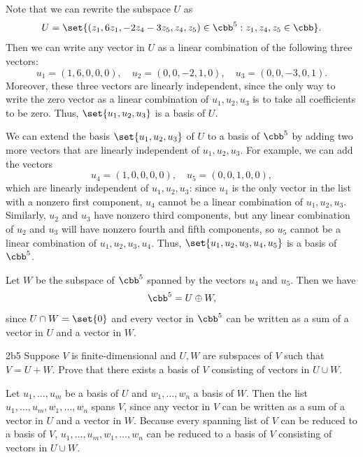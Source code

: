 \begin{solenum}
    \item Note that we can rewrite the subspace $U$ as
    \[
    	U = \set{(z_1, 6z_1, -2z_4 - 3z_5, z_4, z_5) \in \cbb^5 : z_1, z_4, z_5 \in \cbb}.
    \]
    Then we can write any vector in $U$ as a linear combination of the following three vectors:
    \[
    	u_1 = (1, 6, 0, 0, 0), \quad u_2 = (0, 0, -2, 1, 0), \quad u_3 = (0, 0, -3, 0, 1).
    \]
    Moreover, these three vectors are linearly independent, since the only way to write the zero vector as a linear combination of $u_1, u_2, u_3$ is to take all coefficients to be zero.
	Thus, $\set{u_1, u_2, u_3}$ is a basis of $U$.
    \item We can extend the basis $\set{u_1, u_2, u_3}$ of $U$ to a basis of $\cbb^5$ by adding two more vectors that are linearly independent of $u_1, u_2, u_3$.
	For example, we can add the vectors
    \[
    	u_4 = (1, 0, 0, 0, 0), \quad u_5 = (0, 0, 1, 0, 0),
    \]
    which are linearly independent of $u_1, u_2, u_3$: since $u_1$ is the only vector in the list with a nonzero first component, $u_4$ cannot be a linear combination of $u_1, u_2, u_3$.
	Similarly, $u_2$ and $u_3$ have nonzero third components, but any linear combination of $u_2$ and $u_3$ will have nonzero fourth and fifth components, so $u_5$ cannot be a linear combination of $u_1, u_2, u_3, u_4$.
	Thus, $\set{u_1, u_2, u_3, u_4, u_5}$ is a basis of $\cbb^5$.
    \item Let $W$ be the subspace of $\cbb^5$ spanned by the vectors $u_4$ and $u_5$.
	Then we have
    \[
    	\cbb^5 = U \oplus W,
    \]
    since $U \cap W = \set{0}$ and every vector in $\cbb^5$ can be written as a sum of a vector in $U$ and a vector in $W$.
\end{solenum}

\begin{exercise}{2b5}
    Suppose $V$ is finite-dimensional and $U, W$ are subspaces of $V$ such that $V = U + W$.
	Prove that there exists a basis of $V$ consisting of vectors in $U \cup W$.
\end{exercise}

\begin{sol}
    Let $u_1, \ldots, u_m$ be a basis of $U$ and $w_1, \ldots, w_n$ a basis of $W$.
	Then the list $u_1, \ldots, u_m, w_1, \ldots, w_n$ spans $V$, since any vector in $V$ can be written as a sum of a vector in $U$ and a vector in $W$.
	Because every spanning list of $V$ can be reduced to a basis of $V$, $u_1, \ldots, u_m, w_1, \ldots, w_n$ can be reduced to a basis of $V$ consisting of vectors in $U \cup W$.
\end{sol}

